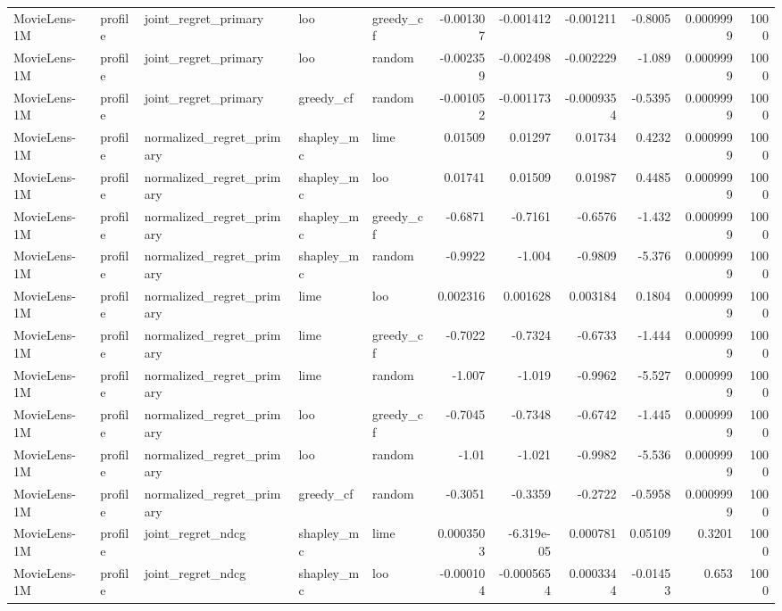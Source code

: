 \begin{table}[t]
\begin{tabular}{lllllrrrrrr}
MovieLens-1M & profile & joint\_regret\_primary & loo & greedy\_cf & -0.001307 & -0.001412 & -0.001211 & -0.8005 & 0.0009999 & 1000 \\
MovieLens-1M & profile & joint\_regret\_primary & loo & random & -0.002359 & -0.002498 & -0.002229 & -1.089 & 0.0009999 & 1000 \\
MovieLens-1M & profile & joint\_regret\_primary & greedy\_cf & random & -0.001052 & -0.001173 & -0.0009354 & -0.5395 & 0.0009999 & 1000 \\
MovieLens-1M & profile & normalized\_regret\_primary & shapley\_mc & lime & 0.01509 & 0.01297 & 0.01734 & 0.4232 & 0.0009999 & 1000 \\
MovieLens-1M & profile & normalized\_regret\_primary & shapley\_mc & loo & 0.01741 & 0.01509 & 0.01987 & 0.4485 & 0.0009999 & 1000 \\
MovieLens-1M & profile & normalized\_regret\_primary & shapley\_mc & greedy\_cf & -0.6871 & -0.7161 & -0.6576 & -1.432 & 0.0009999 & 1000 \\
MovieLens-1M & profile & normalized\_regret\_primary & shapley\_mc & random & -0.9922 & -1.004 & -0.9809 & -5.376 & 0.0009999 & 1000 \\
MovieLens-1M & profile & normalized\_regret\_primary & lime & loo & 0.002316 & 0.001628 & 0.003184 & 0.1804 & 0.0009999 & 1000 \\
MovieLens-1M & profile & normalized\_regret\_primary & lime & greedy\_cf & -0.7022 & -0.7324 & -0.6733 & -1.444 & 0.0009999 & 1000 \\
MovieLens-1M & profile & normalized\_regret\_primary & lime & random & -1.007 & -1.019 & -0.9962 & -5.527 & 0.0009999 & 1000 \\
MovieLens-1M & profile & normalized\_regret\_primary & loo & greedy\_cf & -0.7045 & -0.7348 & -0.6742 & -1.445 & 0.0009999 & 1000 \\
MovieLens-1M & profile & normalized\_regret\_primary & loo & random & -1.01 & -1.021 & -0.9982 & -5.536 & 0.0009999 & 1000 \\
MovieLens-1M & profile & normalized\_regret\_primary & greedy\_cf & random & -0.3051 & -0.3359 & -0.2722 & -0.5958 & 0.0009999 & 1000 \\
MovieLens-1M & profile & joint\_regret\_ndcg & shapley\_mc & lime & 0.0003503 & -6.319e-05 & 0.000781 & 0.05109 & 0.3201 & 1000 \\
MovieLens-1M & profile & joint\_regret\_ndcg & shapley\_mc & loo & -0.000104 & -0.0005654 & 0.0003344 & -0.01453 & 0.653 & 1000 \\

\end{tabular}
\end{table}
